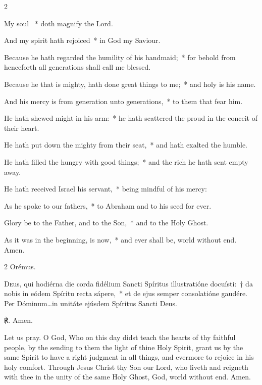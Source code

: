 \documentclass[12pt]{book}
\begin{document}
\begin{multicols}{2}
 \begin{enpars}
My soul \cc~* doth magnify the Lord.

And my spirit hath rejoiced~* in God my Saviour.

Because he hath regarded the humility of his handmaid;~* for behold from henceforth all generations shall call me blessed.

Because he that is mighty, hath done great things to me;~* and holy is his name.

And his mercy is from generation unto generations,~* to them that fear him.

He hath shewed might in his arm:~* he hath scattered the proud in the conceit of their heart.

He hath put down the mighty from their seat,~* and hath exalted the humble.

He hath filled the hungry with good things;~* and the rich he hath sent empty away.

He hath received Israel his servant,~* being mindful of his mercy:

As he spoke to our fathers,~* to Abraham and to his seed for ever.

Glory be to the Father, and to the Son,~* and to the Holy Ghost.

As it was in the beginning, is now,~* and ever shall be, world without end. Amen.
\end{enpars}
\end{multicols}





   \begin{paracol}{2}
   Orémus.
   
\label{oratio_dom_pent}

\lettrine{D}{e}us, qui hodiérna die corda fidélium Sancti Spíritus illustratióne docuísti:~† da nobis in eódem Spíritu re\-cta sápere,~* et de ejus semper consolatióne gaudére. Per Dóminum…in unitáte ejúsdem Spíritus Sancti Deus.

   ℟. Amen.
   
\switchcolumn
\begin{enpars}
\noindent Let us pray.
O God, Who on this day didst teach the hearts of thy faithful people, by the sending to them the light of thine Holy Spirit, grant us by the same Spirit to have a right judgment in all things, and evermore to rejoice in his holy comfort.
Through Jesus Christ thy Son our Lord, who liveth and reigneth with thee in the unity of the same Holy Ghost, God, world without end.
 Amen.
\end{enpars}
    \end{paracol}
    
\end{document}
